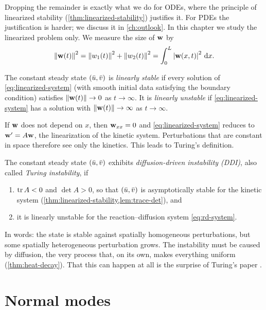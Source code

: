 Dropping the remainder is exactly what we do for ODEs, where the principle of
linearized stability (\cref{thm:linearized-stability}) justifies it. For PDEs the
justification is harder; we discuss it in \cref{ch:outlook}. In this chapter we
study the linearized problem only. We measure the size of $\mathbf{w}$ by
\begin{equation*}
  \left\lVert \mathbf{w}(t)\right\rVert^2 = \left\lVert w_1(t)\right\rVert^2+\left\lVert w_2(t)\right\rVert^2
  = \int_0^L \left\lvert \mathbf{w}(x,t)\right\rvert^2\,\mathrm{d} x .
\end{equation*}

\begin{definition}\label{def:linear-stability-rd}
The constant steady state $(\bar u,\bar v)$ is \emph{linearly stable} if every solution
of \eqref{eq:linearized-system} (with smooth initial data satisfying the boundary
condition) satisfies $\left\lVert \mathbf{w}(t)\right\rVert\to0$ as $t\to\infty$. It is \emph{linearly
unstable} if \eqref{eq:linearized-system} has a solution with
$\left\lVert \mathbf{w}(t)\right\rVert\to\infty$ as $t\to\infty$.
\end{definition}

If $\mathbf{w}$ does not depend on $x$, then $\mathbf{w}_{xx}=0$ and \eqref{eq:linearized-system}
reduces to $\mathbf{w}'=A\mathbf{w}$, the linearization of the kinetic system. Perturbations that
are constant in space therefore see only the kinetics. This leads to Turing's
definition.

\begin{definition}\label{def:ddi}
The constant steady state $(\bar u,\bar v)$ exhibits \emph{diffusion-driven instability
(DDI)}, also called \emph{Turing instability}, if
\begin{enumerate}[label=(\roman*)]
  \item $\operatorname{tr} A<0$ and $\det A>0$, so that $(\bar u,\bar v)$ is asymptotically stable
        for the kinetic system (\cref{thm:linearized-stability,lem:trace-det}),
        and
  \item it is linearly unstable for the reaction--diffusion system
        \eqref{eq:rd-system}.
\end{enumerate}
\end{definition}

In words: the state is stable against spatially homogeneous perturbations, but
some spatially heterogeneous perturbation grows. The instability must be caused by
diffusion, the very process that, on its own, makes everything uniform
(\cref{thm:heat-decay}). That this can happen at all is the surprise of Turing's
paper \cite{Turing1952}.

\section{Normal modes}\label{sec:turing-modes}

